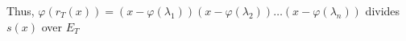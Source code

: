 \documentclass[preview]{standalone}
\begin{document}
\begin{center}
Thus, $\varphi(r_T(x)) = (x - \varphi(\lambda_1))(x - \varphi(\lambda_2))\dots (x - \varphi(\lambda_n))$ divides $s(x)$ over $E_T$
\end{center}
\end{document}
